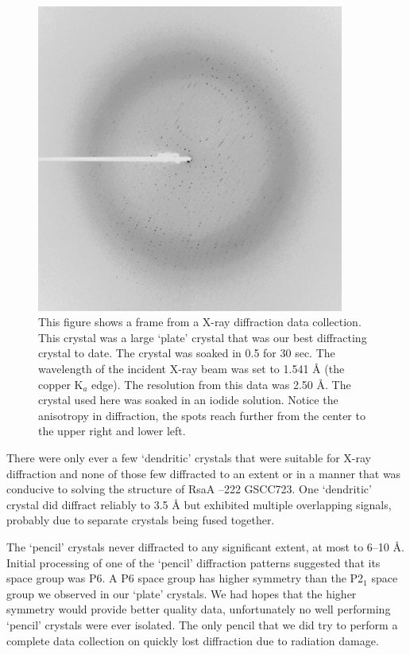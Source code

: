 \begin{figure}[htb]
  	\begin{center}
   		\includegraphics[width=0.9\textwidth]{crystal_chapter/img/rsaadiffraction.pdf}
   	\end{center}
   	\caption[A diffraction pattern of RsaA --222, `plate' crystal]{This figure shows a frame from a X-ray diffraction data collection. 
This crystal was a large `plate' crystal that was our best diffracting crystal to date. The crystal was soaked in 0.5
 \si{\molar} 
for 30 sec. The wavelength of the incident X-ray beam was set to 1.541 \AA{}
(the copper K$_{a}$ edge). The resolution from this data was 2.50 \AA{}. The
crystal used here was soaked in an iodide solution. Notice the anisotropy in diffraction, \ie the spots reach further from the center to the upper right and lower left.}
   	\label{fig:diffraction}
\end{figure}   

There were only ever a few `dendritic' crystals that were suitable for X-ray diffraction and none of those few diffracted to an extent or in a manner that was conducive to solving the structure of RsaA --222 GSCC723. One `dendritic' crystal did diffract reliably to 3.5 \AA{} but exhibited multiple overlapping signals, probably due to separate crystals being fused together.  

The `pencil' crystals never diffracted to any significant extent, at most to 6--10 \AA{}. Initial processing of one of the `pencil' diffraction patterns suggested that its space group was P6. A P6 space group has higher symmetry than the P2$_{1}$ space group we observed in our `plate' crystals. We had hopes that the higher symmetry would provide better quality data, unfortunately no well performing `pencil' crystals were ever isolated. The only pencil that we did try to perform a complete data collection on quickly lost diffraction due to radiation damage.

